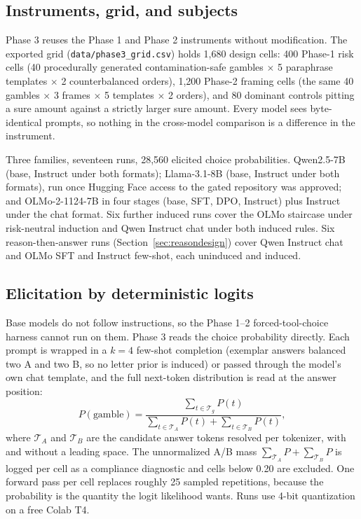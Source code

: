 \documentclass[11pt]{article}
\begin{document}
\subsection{Instruments, grid, and subjects}
Phase 3 reuses the Phase 1 and Phase 2 instruments without modification. The exported grid
(\texttt{data/phase3\_grid.csv}) holds 1{,}680 design cells: 400 Phase-1 risk cells (40 procedurally
generated contamination-safe gambles $\times$ 5 paraphrase templates $\times$ 2 counterbalanced
orders), 1{,}200 Phase-2 framing cells (the same 40 gambles $\times$ 3 frames $\times$ 5 templates
$\times$ 2 orders), and 80 dominant controls pitting a sure amount against a strictly larger sure
amount. Every model sees byte-identical prompts, so nothing in the cross-model comparison is a
difference in the instrument.

Three families, seventeen runs, 28{,}560 elicited choice probabilities. Qwen2.5-7B (base, Instruct under
both formats); Llama-3.1-8B (base, Instruct under both formats), run once Hugging Face access to the
gated repository was approved; and OLMo-2-1124-7B in four stages (base, SFT, DPO, Instruct) plus Instruct
under the chat format. Six further induced runs cover the OLMo staircase under risk-neutral induction and
Qwen Instruct chat under both induced rules. Six reason-then-answer runs (Section~\ref{sec:reasondesign})
cover Qwen Instruct chat and OLMo SFT and Instruct few-shot, each uninduced and induced.

\subsection{Elicitation by deterministic logits}
Base models do not follow instructions, so the Phase 1--2 forced-tool-choice harness cannot run on
them. Phase 3 reads the choice probability directly. Each prompt is wrapped in a $k = 4$ few-shot
completion (exemplar answers balanced two A and two B, so no letter prior is induced) or passed through
the model's own chat template, and the full next-token distribution is read at the answer position:
\[
  P(\text{gamble}) = \frac{\sum_{t \in \mathcal{T}_g} P(t)}{\sum_{t \in \mathcal{T}_A} P(t)
  + \sum_{t \in \mathcal{T}_B} P(t)},
\]
where $\mathcal{T}_A$ and $\mathcal{T}_B$ are the candidate answer tokens resolved per tokenizer, with
and without a leading space. The unnormalized A/B mass $\sum_{\mathcal{T}_A} P + \sum_{\mathcal{T}_B} P$
is logged per cell as a compliance diagnostic and cells below 0.20 are excluded. One forward pass per
cell replaces roughly 25 sampled repetitions, because the probability is the quantity the logit
likelihood wants. Runs use 4-bit quantization on a free Colab T4.
\end{document}

